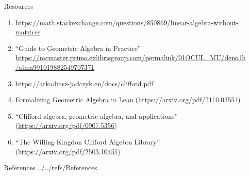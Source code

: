 \documentclass[aspectratio=169,xcolor=dvipsnames]{beamer}
\begin{document}
\begin{frame}{Resources}
      \begin{enumerate}
      \item \url{https://math.stackexchange.com/questions/850869/linear-algebra-without-matrices}
      \item ``Guide to Geometric Algebra in Practice'' \url{https://mcmaster.primo.exlibrisgroup.com/permalink/01OCUL_MU/deno1h/alma991019882549707371}
      \item \url{https://arkadiusz-jadczyk.eu/docs/clifford.pdf}
      \item Formalizing Geometric Algebra in Lean (\url{https://arxiv.org/pdf/2110.03551})
      \item ``Clifford algebra, geometric algebra, and applications'' (\url{https://arxiv.org/pdf/0907.5356})
      \item ``The Willing Kingdon Clifford Algebra Library'' (\url{https://arxiv.org/pdf/2503.10451})
      \end{enumerate}
\end{frame}

\begin{frame}{References}
    \tiny
     {../../refs/References}
    
\end{frame}

\end{document}
